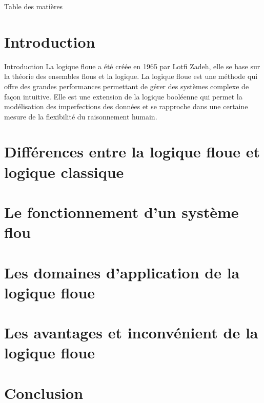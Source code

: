 \documentclass[aspectratio=169,professionalfonts, 12pt]{beamer}
\date{\today}
\begin{document}

  \begin{frame}
    \titlepage
  \end{frame}

  \begin{frame}{Table des matières}
    \tableofcontents
  \end{frame}

\section{Introduction}



\begin{frame}{Introduction}
  La logique floue a été créée en 1965 par Lotfi Zadeh, elle se base sur la théorie
  des ensembles flous et la logique. La logique floue est une méthode qui offre des grandes
  performances permettant de gérer des systèmes complexe de façon intuitive. Elle est
  une extension de la logique booléenne qui permet la modélisation des imperfections des données
  et se rapproche dans une certaine mesure de la flexibilité du raisonnement humain.
\end{frame}

\section{Différences entre la logique floue et logique classique}
\section{Le fonctionnement d’un système flou}
\section{Les domaines d’application de la logique floue}
\section{Les avantages et inconvénient de la logique floue}
\section{Conclusion}
\end{document}

